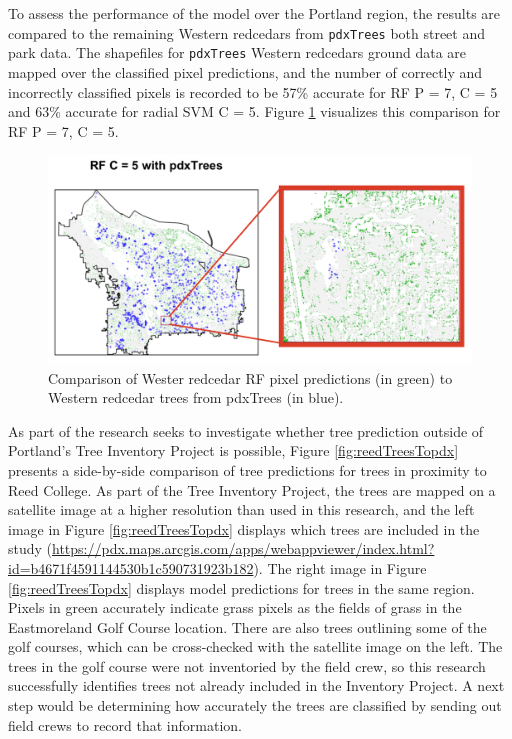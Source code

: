 \documentclass[12pt,twoside]{reedthesis}
\begin{document}
To assess the performance of the model over the Portland region, the results are compared to the remaining Western redcedars from \texttt{pdxTrees} both street and park data. The shapefiles for \texttt{pdxTrees} Western redcedars ground data are mapped over the classified pixel predictions, and the number of correctly and incorrectly classified pixels is recorded to be 57\% accurate for RF P = 7, C = 5 and 63\% accurate for radial SVM C = 5. Figure \ref{fig:resultsToStreet} visualizes this comparison for RF P = 7, C = 5.
\begin{figure}

{\centering \includegraphics[width=1\linewidth]{figure/resultsToStreet} 

}

\caption{Comparison of Wester redcedar RF pixel predictions (in green) to Western redcedar trees from pdxTrees (in blue).}\label{fig:resultsToStreet}
\end{figure}
As part of the research seeks to investigate whether tree prediction outside of Portland's Tree Inventory Project is possible, Figure \ref{fig:reedTreesTopdx} presents a side-by-side comparison of tree predictions for trees in proximity to Reed College. As part of the Tree Inventory Project, the trees are mapped on a satellite image at a higher resolution than used in this research, and the left image in Figure \ref{fig:reedTreesTopdx} displays which trees are included in the study (\url{https://pdx.maps.arcgis.com/apps/webappviewer/index.html?id=b4671f4591144530b1c590731923b182}). The right image in Figure \ref{fig:reedTreesTopdx} displays model predictions for trees in the same region. Pixels in green accurately indicate grass pixels as the fields of grass in the Eastmoreland Golf Course location. There are also trees outlining some of the golf courses, which can be cross-checked with the satellite image on the left. The trees in the golf course were not inventoried by the field crew, so this research successfully identifies trees not already included in the Inventory Project. A next step would be determining how accurately the trees are classified by sending out field crews to record that information.
\end{document}
